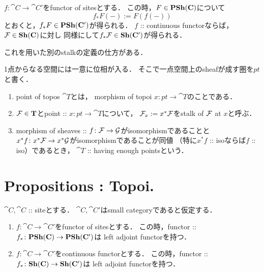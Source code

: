 \documentclass[a4paper, dvipdfmx]{jsarticle}
\begin{document}
\begin{Def}
    $f \colon \cat{C} \to \cat{C}'$をfunctor of sitesとする．
    この時，$F \in \mathbf{PSh}(\mathbf{C})$について
    \[ f_*F(-):=F(f(-)) \]
    とおくと，$f_* F \in \mathbf{PSh}(\mathbf{C}')$が得られる．
    $f$ :: continuous functorならば，
    $\mathcal{F} \in \mathbf{Sh}(\mathbf{C})$に対し
    同様にして$f_*\mathcal{F} \in \mathbf{Sh}(\mathbf{C}')$が得られる．
\end{Def}

これを用いた別のstalkの定義の仕方がある．
\begin{Def}
    1点からなる空間には一意に位相が入る．
    そこで一点空間上のsheafが成す圏を$pt$と書く．
    \begin{enumerate}[label=(\roman*)]
        \item
            point of topos $\cat{T}$とは，
            morphism of topoi $x \colon pt \to \cat{T}$のことである．
        \item
            $\mathcal{F} \in \mathbf{T}$とpoint :: $x \colon pt \to \cat{T}$について，
            $\mathcal{F}_x := x^*\mathcal{F}$をstalk of $\mathcal{F}$ at $x$と呼ぶ．
        \item
            morphism of sheaves :: $f \colon \mathcal{F} \to \mathcal{G}$がisomorphismであることと
            $x^* f \colon x^* \mathcal{F} \to x^* \mathcal{G}$がisomorphismであることが同値
            （特に$x^*f$ :: isoならば$f$ :: iso）であるとき，
            $\cat{T}$ :: having enough pointsという．
    \end{enumerate}
\end{Def}

\section{Propositions : Topoi.}
\begin{Prop}
    $\cat{C}, \cat{C}$ :: siteとする．
    $\cat{C}, \cat{C}'$はsmall categoryであると仮定する．
    \begin{enumerate}[label=(\roman*)]
    \item
    $f \colon \cat{C} \to \cat{C}'$をfunctor of sitesとする．
    この時，functor :: $f_* \colon \mathbf{PSh}(\mathbf{C}) \to \mathbf{PSh}(\mathbf{C}')$は
    left adjoint functorを持つ．
    
    \item
    $f \colon \cat{C} \to \cat{C}'$をcontinuous functorとする．
    この時，functor :: $f_* \colon \mathbf{Sh}(\mathbf{C}) \to \mathbf{Sh}(\mathbf{C}')$は
    left adjoint functorを持つ．
    \end{enumerate}
\end{Prop}
\end{document}
